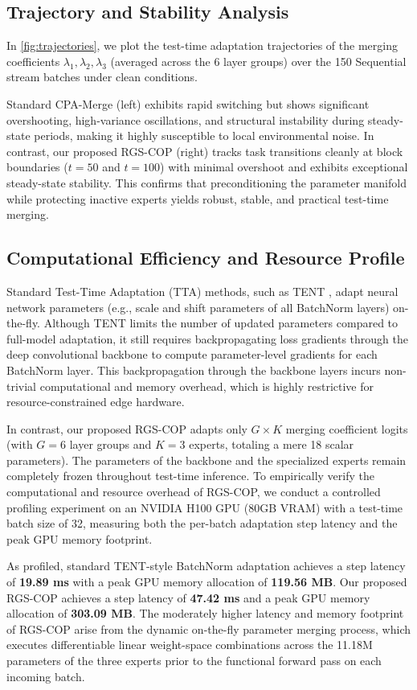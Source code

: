 \documentclass{article}
\theoremstyle{plain}
\theoremstyle{definition}
\theoremstyle{remark}
\begin{document}
\subsection{Trajectory and Stability Analysis}
In \cref{fig:trajectories}, we plot the test-time adaptation trajectories of the merging coefficients $\lambda_1, \lambda_2, \lambda_3$ (averaged across the 6 layer groups) over the 150 Sequential stream batches under clean conditions. 

Standard CPA-Merge (left) exhibits rapid switching but shows significant overshooting, high-variance oscillations, and structural instability during steady-state periods, making it highly susceptible to local environmental noise. In contrast, our proposed RGS-COP (right) tracks task transitions cleanly at block boundaries ($t=50$ and $t=100$) with minimal overshoot and exhibits exceptional steady-state stability. This confirms that preconditioning the parameter manifold while protecting inactive experts yields robust, stable, and practical test-time merging.

\subsection{Computational Efficiency and Resource Profile}
Standard Test-Time Adaptation (TTA) methods, such as TENT \cite{Wang2021}, adapt neural network parameters (e.g., scale and shift parameters of all BatchNorm layers) on-the-fly. Although TENT limits the number of updated parameters compared to full-model adaptation, it still requires backpropagating loss gradients through the deep convolutional backbone to compute parameter-level gradients for each BatchNorm layer. This backpropagation through the backbone layers incurs non-trivial computational and memory overhead, which is highly restrictive for resource-constrained edge hardware.

In contrast, our proposed RGS-COP adapts only $G \times K$ merging coefficient logits (with $G=6$ layer groups and $K=3$ experts, totaling a mere 18 scalar parameters). The parameters of the backbone and the specialized experts remain completely frozen throughout test-time inference. To empirically verify the computational and resource overhead of RGS-COP, we conduct a controlled profiling experiment on an NVIDIA H100 GPU (80GB VRAM) with a test-time batch size of 32, measuring both the per-batch adaptation step latency and the peak GPU memory footprint.

As profiled, standard TENT-style BatchNorm adaptation achieves a step latency of \textbf{19.89 ms} with a peak GPU memory allocation of \textbf{119.56 MB}. Our proposed RGS-COP achieves a step latency of \textbf{47.42 ms} and a peak GPU memory allocation of \textbf{303.09 MB}. The moderately higher latency and memory footprint of RGS-COP arise from the dynamic on-the-fly parameter merging process, which executes differentiable linear weight-space combinations across the 11.18M parameters of the three experts prior to the functional forward pass on each incoming batch. 
\end{document}
